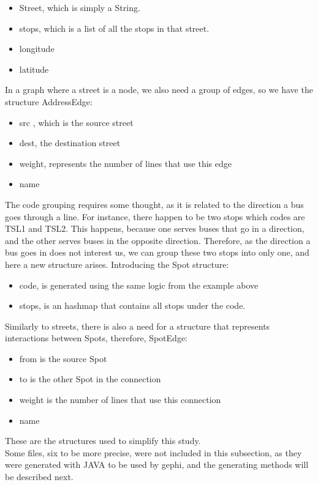\documentclass[12pt]{article}
\begin{document}
	\begin{itemize}
		\item Street, which is simply a String.
		\item stops, which is a list of all the stops in that street.
		\item longitude
		\item latitude
	\end{itemize}
	
	In a graph where a street is a node, we also need a group of edges, so we have the structure AddressEdge: 
	\begin{itemize}
		\item src , which is the source street
		\item dest, the destination street
		\item weight, represents the number of lines that use this edge
		\item name
	\end{itemize}
	
	The code grouping requires some thought, as it is related to the direction a bus goes through a line. For instance, there happen to be two stops which codes are TSL1 and TSL2. This happens, because one serves buses that go in a direction, and the other serves buses in the opposite direction. Therefore, as the direction a bus goes in does not interest us, we can group these two stops into only one, and here a new structure arises. Introducing the Spot structure:
	
	\begin{itemize}
		\item code, is generated using the same logic from the example above
		\item stops, is an hashmap that contains all stops under the code.
	\end{itemize}
	
	Similarly to streets, there is also a need for a structure that represents interactions between Spots, therefore, SpotEdge:
	
		\begin{itemize}
			\item from is the source Spot
			\item to is the other Spot in the connection
			\item weight is the number of lines that use this connection
			\item name
		\end{itemize}
	
	These are the structures used to simplify this study.\\
	Some files, six to be more precise, were not included in this subsection, as they were generated with JAVA to be used by gephi, and the generating methods will be described next.
\end{document}
